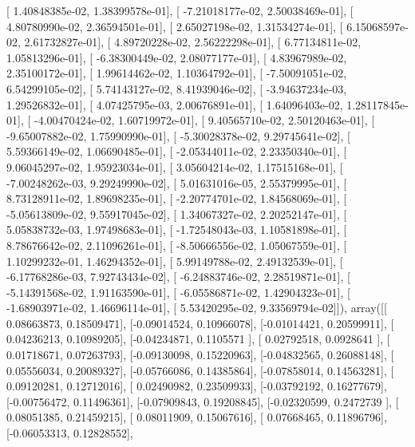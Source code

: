 \documentclass{article}
\begin{document}
       [  1.40848385e-02,   1.38399578e-01],
       [ -7.21018177e-02,   2.50038469e-01],
       [  4.80780990e-02,   2.36594501e-01],
       [  2.65027198e-02,   1.31534274e-01],
       [  6.15068597e-02,   2.61732827e-01],
       [  4.89720228e-02,   2.56222298e-01],
       [  6.77134811e-02,   1.05813296e-01],
       [ -6.38300449e-02,   2.08077177e-01],
       [  4.83967989e-02,   2.35100172e-01],
       [  1.99614462e-02,   1.10364792e-01],
       [ -7.50091051e-02,   6.54299105e-02],
       [  5.74143127e-02,   8.41939046e-02],
       [ -3.94637234e-03,   1.29526832e-01],
       [  4.07425795e-03,   2.00676891e-01],
       [  1.64096403e-02,   1.28117845e-01],
       [ -4.00470424e-02,   1.60719972e-01],
       [  9.40565710e-02,   2.50120463e-01],
       [ -9.65007882e-02,   1.75990990e-01],
       [ -5.30028378e-02,   9.29745641e-02],
       [  5.59366149e-02,   1.06690485e-01],
       [ -2.05344011e-02,   2.23350340e-01],
       [  9.06045297e-02,   1.95923034e-01],
       [  3.05604214e-02,   1.17515168e-01],
       [ -7.00248262e-03,   9.29249990e-02],
       [  5.01631016e-05,   2.55379995e-01],
       [  8.73128911e-02,   1.89698235e-01],
       [ -2.20774701e-02,   1.84568069e-01],
       [ -5.05613809e-02,   9.55917045e-02],
       [  1.34067327e-02,   2.20252147e-01],
       [  5.05838732e-03,   1.97498683e-01],
       [ -1.72548043e-03,   1.10581898e-01],
       [  8.78676642e-02,   2.11096261e-01],
       [ -8.50666556e-02,   1.05067559e-01],
       [  1.10299232e-01,   1.46294352e-01],
       [  5.99149788e-02,   2.49132539e-01],
       [ -6.17768286e-03,   7.92743434e-02],
       [ -6.24883746e-02,   2.28519871e-01],
       [ -5.14391568e-02,   1.91163590e-01],
       [ -6.05586871e-02,   1.42904323e-01],
       [ -1.68903971e-02,   1.46696114e-01],
       [  5.53420295e-02,   9.33569794e-02]]), array([[ 0.08663873,  0.18509471],
       [-0.09014524,  0.10966078],
       [-0.01014421,  0.20599911],
       [ 0.04236213,  0.10989205],
       [-0.04234871,  0.1105571 ],
       [ 0.02792518,  0.0928641 ],
       [ 0.01718671,  0.07263793],
       [-0.09130098,  0.15220963],
       [-0.04832565,  0.26088148],
       [ 0.05556034,  0.20089327],
       [-0.05766086,  0.14385864],
       [-0.07858014,  0.14563281],
       [ 0.09120281,  0.12712016],
       [ 0.02490982,  0.23509933],
       [-0.03792192,  0.16277679],
       [-0.00756472,  0.11496361],
       [-0.07909843,  0.19208845],
       [-0.02320599,  0.2472739 ],
       [ 0.08051385,  0.21459215],
       [ 0.08011909,  0.15067616],
       [ 0.07668465,  0.11896796],
       [-0.06053313,  0.12828552],
\end{document}
